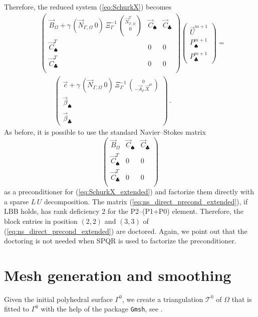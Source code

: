 \documentclass[a4paper,12pt,onecolumn]{article}
\newcommand{\NbulkT}{\vec{N}_{\Gamma,\Omega}^T}
\newcommand{\Nbulk}{\vec{N}_{\Gamma,\Omega}}
\begin{document}
Therefore, the reduced system (\ref{eq:SchurkX}) becomes
\begin{align}\label{eq:SchurkX_extended}
&
\begin{pmatrix}
\vec B_\Omega + \gamma\,(\Nbulk \ 0)\,\Xi_\Gamma^{-1}\,\binom{\NbulkT}{0} &
\vec C_\spadesuit & \vec C_\clubsuit \\
\vec C^T_\spadesuit & 0 & 0 \\
\vec C^T_\clubsuit & 0 & 0 \\
\end{pmatrix}
\begin{pmatrix}
\vec U^{m+1} \\
P^{m+1}_\spadesuit \\
P^{m+1}_\clubsuit
\end{pmatrix}
= \nonumber \\
& \qquad
\begin{pmatrix}
\vec c+\gamma\,(\Nbulk \ 0)\,
\Xi_\Gamma^{-1}\,\binom{0}{-\vec A_\Gamma\,\vec X^m} \\
\vec \beta_\spadesuit \\
\vec \beta_\clubsuit
\end{pmatrix}\,.
\end{align}
As before, it is possible to use the standard Navier--Stokes
matrix
\begin{equation}\label{eq:ns_direct_precond_extended}
\begin{pmatrix}
\vec B_\Omega & \vec C_\spadesuit & \vec C_\clubsuit \\
\vec C^T_\spadesuit & 0 & 0 \\
\vec C^T_\clubsuit & 0 & 0 \\
\end{pmatrix}
\end{equation}
as a preconditioner for (\ref{eq:SchurkX_extended}) and factorize
them directly with a sparse $L\,U$ decomposition. The matrix
(\ref{eq:ns_direct_precond_extended}), if LBB holds, has rank deficiency 2 for
the P2--(P1+P0) element. Therefore, the block entries in position
$(2,2)$ and $(3,3)$ of (\ref{eq:ns_direct_precond_extended}) are doctored.
Again, we point out that the doctoring is not needed when SPQR is used to
factorize the preconditioner.

\section{Mesh generation and smoothing}\label{sec:smoothing}
Given the initial polyhedral surface $\Gamma^0$, we create a triangulation
$\mathcal{T}^0$ of $\Omega$ that is fitted to $\Gamma^0$ with the help of the
package \verb|Gmsh|, see \cite{GeuzaineR09}.
\end{document}
